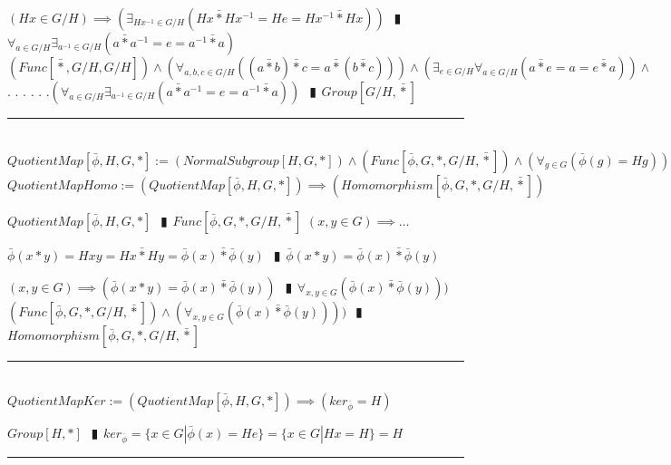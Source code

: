 \documentclass{book}
\newcommand{\abr}{:=}
\newcommand{\cont}{\phantom{.}. . .\phantom{.}}
\newcommand{\pipe}{$\phantom{(}\vrectangleblack\phantom{)}$}
\newcommand{\pr}[1]{\left(#1\right)}
\newcommand{\bbin}[1]{\mathbin{{\bar{#1}}}}
\begin{document}
\begin{enumerate}
\begin{enumerate}
  \end{enumerate}
  \lit $(H x \in G / H) \implies \pr{\exists_{H x^{-1} \in G / H}(H x \bbin{*} H x^{-1} = H e = H x^{-1} \bbin{*} H x)}$ \pipe $\forall_{a \in G / H} \exists_{a^{-1} \in G / H}(a \bbin{*} a^{-1} = e = a^{-1} \bbin{*} a)$
  \lit $(Func[\bbin{*}, G / H, G / H]) \land \pr{\forall_{a, b, c \in G / H}\pr{(a \bbin{*} b) \bbin{*} c = a \bbin{*} (b \bbin{*} c)}} \land \pr{\exists_{e \in G / H} \forall_{a \in G / H}(a \bbin{*} e = a = e \bbin{*} a)} \land$ \cont
  \lit \cont $\pr{\forall_{a \in G / H} \exists_{a^{-1} \in G / H}(a \bbin{*} a^{-1} = e = a^{-1} \bbin{*} a)}$ \pipe $Group[G / H, \bbin{*}]$
\end{enumerate} \vspace{.75mm} \hrule \vspace{.75mm} \ \\ 

$QuotientMap[\bar{\phi}, H, G, *] \abr (NormalSubgroup[H, G, *]) \land (Func[\bar{\phi}, G, *, G / H, \bbin{*}]) \land \pr{\forall_{g \in G}\pr{\bar{\phi}(g) = H g}}$ \\

$QuotientMapHomo \abr (QuotientMap[\bar{\phi}, H, G, *]) \implies (Homomorphism[\bar{\phi}, G, *, G / H, \bbin{*}])$
\begin{enumerate}
  \lit $QuotientMap[\bar{\phi}, H, G, *]$ \pipe $Func[\bar{\phi}, G, *, G / H, \bbin{*}]$
  \lit $(x, y \in G) \implies \ldots$
  \begin{enumerate}
    \lit $\bar{\phi}(x * y) = H x y = H x \bbin{*} H y = \bar{\phi}(x) \bbin{*} \bar{\phi}(y)$ \pipe $\bar{\phi}(x * y) = \bar{\phi}(x) \bbin{*} \bar{\phi}(y)$
  \end{enumerate}
  \lit $(x, y \in G) \implies \pr{\bar{\phi}(x * y) = \bar{\phi}(x) \bbin{*} \bar{\phi}(y)}$ \pipe $\forall_{x, y \in G}\pr{\bar{\phi}(x) \bbin{*} \bar{\phi}(y)})$
  \lit $(Func[\bar{\phi}, G, *, G / H, \bbin{*}]) \land \pr{\forall_{x, y \in G}\pr{\bar{\phi}(x) \bbin{*} \bar{\phi}(y)}})$ \pipe $Homomorphism[\bar{\phi}, G, *, G / H, \bbin{*}]$
\end{enumerate} \vspace{.75mm} \hrule \vspace{.75mm} \ \\

$QuotientMapKer \abr (QuotientMap[\bar{\phi}, H, G, *]) \implies (ker_{\bar{\phi}} = H)$
\begin{enumerate}
  \lit $Group[H, *]$ \pipe $ker_{\bar{\phi}} = \{x \in G | \bar{\phi}(x) = H e\} = \{x \in G | H x = H\} = H$
\end{enumerate} \vspace{.75mm} \hrule \vspace{.75mm} \ \\ 
\end{document}
